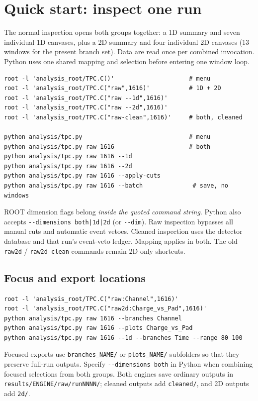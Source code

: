 \documentclass[11pt,a4paper]{article}
\begin{document}
\section{Quick start: inspect one run}
The normal inspection opens both groups together: a 1D summary and seven individual
1D canvases, plus a 2D summary and four individual 2D canvases (13 windows for the
present branch set). Data are read once per combined invocation. Python uses one
shared mapping and selection before entering one window loop.
\begin{lstlisting}
root -l 'analysis_root/TPC.C()'                     # menu
root -l 'analysis_root/TPC.C("raw",1616)'           # 1D + 2D
root -l 'analysis_root/TPC.C("raw --1d",1616)'
root -l 'analysis_root/TPC.C("raw --2d",1616)'
root -l 'analysis_root/TPC.C("raw-clean",1616)'     # both, cleaned

python analysis/tpc.py                              # menu
python analysis/tpc.py raw 1616                     # both
python analysis/tpc.py raw 1616 --1d
python analysis/tpc.py raw 1616 --2d
python analysis/tpc.py raw 1616 --apply-cuts
python analysis/tpc.py raw 1616 --batch              # save, no windows
\end{lstlisting}
ROOT dimension flags belong \emph{inside the quoted command string}. Python also
accepts \texttt{-{}-dimensions both|1d|2d} (or \texttt{-{}-dim}).
Raw inspection bypasses all manual cuts and automatic event vetoes. Cleaned inspection
uses the detector database and that run's event-veto ledger. Mapping applies in both.
The old \texttt{raw2d} / \texttt{raw2d-clean} commands remain 2D-only shortcuts.

\subsection{Focus and export locations}
\begin{lstlisting}
root -l 'analysis_root/TPC.C("raw:Channel",1616)'
root -l 'analysis_root/TPC.C("raw2d:Charge_vs_Pad",1616)'
python analysis/tpc.py raw 1616 --branches Channel
python analysis/tpc.py raw 1616 --plots Charge_vs_Pad
python analysis/tpc.py raw 1616 --1d --branches Time --range 80 100
\end{lstlisting}
Focused exports use \texttt{branches\_NAME/} or \texttt{plots\_NAME/} subfolders so
that they preserve full-run outputs. Specify \texttt{-{}-dimensions both} in Python
when combining focused selections from both groups. Both engines save ordinary
outputs in \texttt{results/ENGINE/raw/runNNNN/}; cleaned outputs add
\texttt{cleaned/}, and 2D outputs add \texttt{2d/}.
\end{document}
